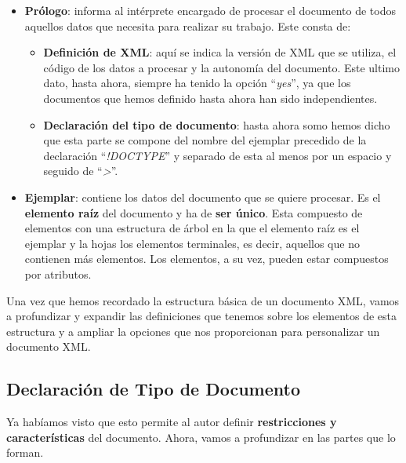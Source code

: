 \begin{itemize}
    \item \textbf{Prólogo}: informa al intérprete encargado de procesar el documento de todos aquellos datos que necesita para realizar su trabajo. Este consta de:
    \begin{itemize}
        \item \textbf{Definición de XML}: aquí se indica la versión de XML que se utiliza, el código de los datos a procesar y la autonomía del documento. Este ultimo dato, hasta ahora, siempre ha tenido la opción ``\textit{yes}'', ya que los documentos que hemos definido hasta ahora han sido independientes.

        \item \textbf{Declaración del tipo de documento}: hasta ahora somo hemos dicho que esta parte se compone del nombre del ejemplar precedido de la declaración ``\textit{!DOCTYPE}'' y separado de esta al menos por un espacio y seguido de  ``\textit{>}''.
    \end{itemize}

    \item \textbf{Ejemplar}: contiene los datos del documento que se quiere procesar. Es el \textbf{elemento raíz} del documento y ha de \textbf{ser único}. Esta compuesto de elementos con una estructura de árbol en la que el elemento raíz es el ejemplar y la hojas los elementos terminales, es decir, aquellos que no contienen más elementos. Los elementos, a su vez, pueden estar compuestos por atributos.
\end{itemize}

Una vez que hemos recordado la estructura básica de un documento XML, vamos a profundizar y expandir las definiciones que tenemos sobre los elementos de esta estructura y a ampliar la opciones que nos proporcionan para personalizar un documento XML.

\subsection{Declaración de Tipo de Documento}
Ya habíamos visto que esto permite al autor definir \textbf{restricciones y características} del documento. Ahora, vamos a profundizar en las partes que lo forman.


